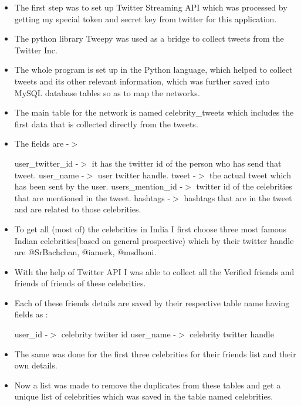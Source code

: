 \documentclass[runningheads,a4paper]{llncs}
\begin{document}
\begin{itemize}

\item The first step was to set up Twitter Streaming API which was processed by getting my special token and secret key from twitter for this application.

\item The python library Tweepy was used as a bridge to collect tweets from the Twitter Inc.

\item The whole program is set up in the Python language, which helped to collect tweets and its other relevant information, which was further saved into MySQL database tables so as to map the networks.

\item The main table for the network is named celebrity\_tweets which includes the first data that is collected directly from the tweets.

\item The fields are -$>$

\subitem	user\_twitter\_id  -$>$  it has the twitter id of the person who has send that tweet.
\subitem	user\_name  -$>$  user twitter handle.
\subitem	tweet  -$>$  the actual tweet which has been sent by the user.
\subitem	users\_mention\_id  -$>$  twitter id of the celebrities that are mentioned in the tweet.
\subitem	hashtags -$>$ hashtags that are in the tweet and are related to those celebrities. 

\item	To get all (most of) the celebrities in India I first choose three most famous Indian celebrities(based on general prospective) which by their twitter handle are @SrBachchan, @iamsrk, @msdhoni. 

\item	With the help of Twitter API I was able to collect all the Verified friends and friends of friends of these celebrities.

\item	Each of these friends details are saved by their respective table name having fields as :

\subitem	user\_id  -$>$  celebrity twiiter id
\subitem	user\_name -$>$ celebrity twitter handle

\item	The same was done for the first three celebrities for their friends list and their own details.

\item	Now a list was made to remove the duplicates from these tables and get a unique list of celebrities which was saved in the table named celebrities.


\end{itemize}
\end{document}
